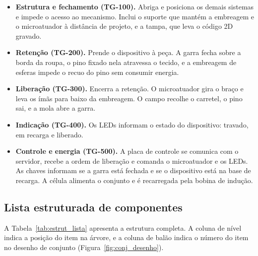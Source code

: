 \begin{itemize}
    \item \textbf{Estrutura e fechamento (TG-100).} Abriga e posiciona os demais sistemas e impede o acesso ao mecanismo. Inclui o suporte que mantém a embreagem e o microatuador à distância de projeto, e a tampa, que leva o código 2D gravado.
    \item \textbf{Retenção (TG-200).} Prende o dispositivo à peça. A garra fecha sobre a borda da roupa, o pino fixado nela atravessa o tecido, e a embreagem de esferas impede o recuo do pino sem consumir energia.
    \item \textbf{Liberação (TG-300).} Encerra a retenção. O microatuador gira o braço e leva os ímãs para baixo da embreagem. O campo recolhe o carretel, o pino sai, e a mola abre a garra.
    \item \textbf{Indicação (TG-400).} Os LEDs informam o estado do dispositivo: travado, em recarga e liberado.
    \item \textbf{Controle e energia (TG-500).} A placa de controle se comunica com o servidor, recebe a ordem de liberação e comanda o microatuador e os LEDs. As chaves informam se a garra está fechada e se o dispositivo está na base de recarga. A célula alimenta o conjunto e é recarregada pela bobina de indução.
\end{itemize}

\subsection{Lista estruturada de componentes}
\label{subsec:estrut_lista}

A Tabela~\ref{tab:estrut_lista} apresenta a estrutura completa. A coluna de nível indica a posição do item na árvore, e a coluna de balão indica o número do item no desenho de conjunto (Figura~\ref{fig:conj_desenho}).


